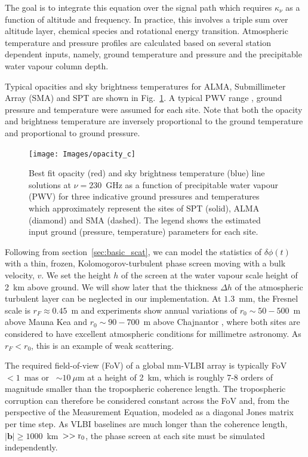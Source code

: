 The goal is to integrate this equation over the signal path which requires $\kappa_\nu$ as a function of altitude and frequency. In practice, this involves a triple sum over altitude layer, chemical species and rotational energy transition. Atmospheric temperature and pressure profiles are calculated based on several station dependent inputs, namely, ground temperature and pressure and the precipitable water vapour column depth.

Typical opacities and sky brightness temperatures for ALMA, Submillimeter Array (SMA) and SPT  are shown in Fig.~\ref{fig:mean_atm}. A typical PWV range \cite{Lane_1998}, ground pressure and temperature were assumed for each site. Note that both the opacity and brightness temperature are inversely proportional to the ground temperature and proportional to ground pressure.

\begin{figure}
\begin{center}
\texttt{[image: Images/opacity\_c]}
\caption{Best fit opacity (red) and sky brightness temperature (blue) line solutions at $\nu =230$~GHz as a function of precipitable water vapour (PWV) for three indicative ground pressures and temperatures which approximately represent the sites of SPT (solid), ALMA (diamond) and SMA (dashed). The legend shows the estimated input ground (pressure, temperature) parameters for each site.\label{fig:mean_atm}%
}
\end{center}
\end{figure}


Following from section~\ref{sec:basic_scat}, we can model the statistics of $\delta \phi(t)$ with a thin, frozen, Kolomogorov-turbulent phase screen moving with a bulk velocity, $v$.  We set the height $h$ of the screen at the water vapour scale height of 2~km above ground. We will show later that the thickness $\Delta h$ of the atmospheric turbulent layer can be neglected in our implementation. At $1.3$~mm, the Fresnel scale is $r_F \approx 0.45$~m and experiments show annual variations of $r_0 \sim 50 - 500$~m above Mauna Kea \citep{Masson_1994} and $r_0 \sim 90 - 700$~m above Chajnantor \citep*{Radford_1998}, where both sites are considered to have excellent atmospheric conditions for millimetre astronomy. As $r_F < r_0$, this is an example of weak scattering. 


The required field-of-view (FoV) of a global mm-VLBI array is typically FoV~$< 1$~mas or ~$\sim10~\mu$m at a height of 2~km, which is roughly 7-8 orders of magnitude smaller than the tropospheric coherence length. The tropospheric corruption can therefore be considered constant across the FoV and, from the perspective of the Measurement Equation, modeled as a diagonal Jones matrix per time step. As VLBI baselines are much longer than the coherence length, $|\mathbf{b}| \ge 1000$~km~$>> \rm r_0$, the phase screen at each site must be simulated independently.



